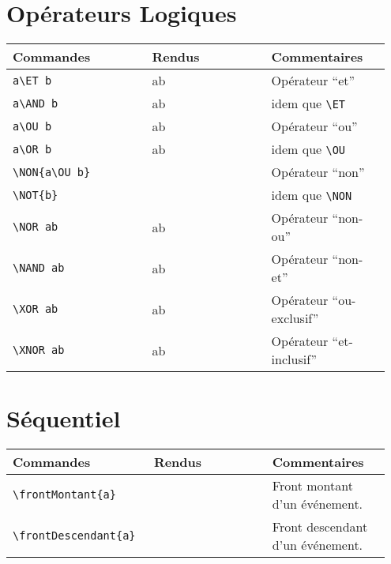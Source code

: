 \documentclass[a4paper,10pt]{article}
\begin{document}
	\section{Opérateurs Logiques}
	\noindent
	\begin{tabular}{|p{0.35\linewidth}|p{0.3\linewidth}|p{0.3\linewidth}|}
		\hline
			\textbf{Commandes}&\textbf{Rendus}&\textbf{Commentaires}
		\\\hline\hline
			\verb!a\ET b!			&	a\ET b			&	Opérateur ``et''
		\\\hline
			\verb!a\AND b!			&	a\AND b			&	idem que \verb!\ET!
		\\\hline
			\verb!a\OU b!			&	a\OU b			&	Opérateur ``ou''
		\\\hline
			\verb!a\OR b!			&	a\OR b			&	idem que \verb!\OU!
		\\\hline
			\verb!\NON{a\OU b}!		&	\NON{a\OU b}		&	Opérateur ``non''
		\\\hline
			\verb!\NOT{b}!			&	\NOT{b}			&	idem que \verb!\NON!
		\\\hline
			\verb!\NOR ab!			&	\NOR ab			&	Opérateur ``non-ou''
		\\\hline
			\verb!\NAND ab!			&	\NAND ab		&	Opérateur ``non-et''
		\\\hline
			\verb!\XOR ab!			&	\XOR ab			&	Opérateur ``ou-exclusif''
		\\\hline
			\verb!\XNOR ab!			&	\XNOR ab		&	Opérateur ``et-inclusif''
		\\\hline
	\end{tabular}

	\section{Séquentiel}
	\noindent
	\begin{tabular}{|p{0.35\linewidth}|p{0.3\linewidth}|p{0.3\linewidth}|}
		\hline
			\textbf{Commandes}&\textbf{Rendus}&\textbf{Commentaires}
		\\\hline\hline
			\verb!\frontMontant{a}!			&	\frontMontant{a}		&	Front montant d'un événement.
		\\\hline
			\verb!\frontDescendant{a}!			&	\frontDescendant{a}	&	Front descendant d'un événement.
		\\\hline
	\end{tabular}
\end{document}
